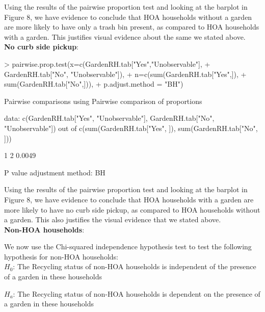\documentclass{article}
\begin{document}
Using the results of the pairwise proportion test and looking at the barplot in Figure 8, we have evidence to conclude that HOA households without a garden are more likely to have only a trash bin present, as compared to HOA households with a garden. This justifies visual evidence about the same we stated above.\\

\textbf{No curb side pickup}:

\begin{Schunk}
\begin{Sinput}
> pairwise.prop.test(x=c(GardenRH.tab["Yes","Unobservable"],
+   GardenRH.tab["No", "Unobservable"]), 
+       n=c(sum(GardenRH.tab["Yes",]), 
+       sum(GardenRH.tab["No",])),
+       p.adjust.method = "BH")
\end{Sinput}
\begin{Soutput}
	Pairwise comparisons using Pairwise comparison of proportions 

data:  c(GardenRH.tab["Yes", "Unobservable"], GardenRH.tab["No", "Unobservable"]) out of c(sum(GardenRH.tab["Yes", ]), sum(GardenRH.tab["No", ])) 

  1     
2 0.0049

P value adjustment method: BH 
\end{Soutput}
\end{Schunk}

Using the results of the pairwise proportion test and looking at the barplot in Figure 8, we have evidence to conclude that HOA households with a garden are more likely to have no curb side pickup, as compared to HOA households without a garden. This also justifies the visual evidence that we stated above.\\

\textbf{Non-HOA households}:

We now use the Chi-squared independence hypothesis test to test the following hypothesis for non-HOA households:\\

$H_{0}$: The Recycling status of non-HOA households is independent of the presence of a garden in these households

$H_{a}$: The Recycling status of non-HOA households is dependent on the presence of a garden in these households\\
\end{document}
